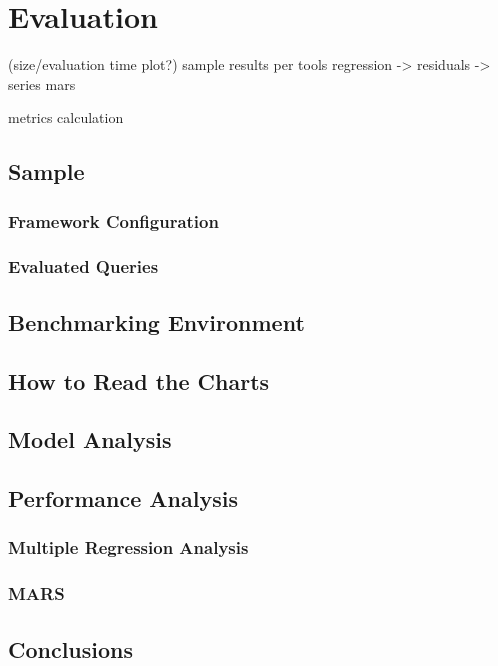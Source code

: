
\chapter{Evaluation}
(size/evaluation time plot?)
sample results per tools
	regression -> residuals -> series
	mars

metrics calculation

\section{Sample}

\subsection{Framework Configuration}

\subsection{Evaluated Queries}

\section{Benchmarking Environment}

\section{How to Read the Charts}

\section{Model Analysis}

\section{Performance Analysis}

\subsection{Multiple Regression Analysis}

\subsection{MARS}

\section{Conclusions}